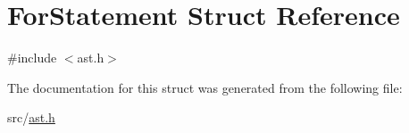 \hypertarget{struct_for_statement}{}\section{For\+Statement Struct Reference}
\label{struct_for_statement}


{\ttfamily \#include $<$ast.\+h$>$}



The documentation for this struct was generated from the following file\+:\begin{DoxyCompactItemize}
\item 
src/\hyperlink{ast_8h}{ast.\+h}\end{DoxyCompactItemize}
